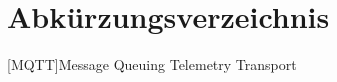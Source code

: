
\section*{Abkürzungsverzeichnis}
\begin{acronym}[MQTT] %
    [MQTT]{Message Queuing Telemetry Transport}
\end{acronym}

